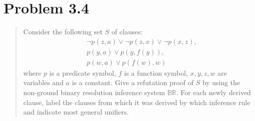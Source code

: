 \documentclass[11pt,a4paper]{article}
\begin{document}
%
%
%
%

\section*{Problem 3.4}
\begin{quote}
Consider the following set $S$ of clauses:
\begin{equation*}
\begin{split}
&\neg p(z, a) \lor \neg p(z, x) \lor \neg p(x, z), \\
&p(y, a) \lor p(y, f (y)), \\
&p(w, a) \lor p(f (w), w)
\end{split}
\end{equation*}
where $p$ is a predicate symbol, $f$ is a function symbol, $x, y, z, w$ are variables and $a$ is a constant. Give a refutation proof of $S$ by using the non-ground binary resolution inference system $\mathbb{BR}$. For each
newly derived clause, label the clauses from which it was derived by which inference rule and indicate most general unifiers.
\end{quote}
\end{document}
